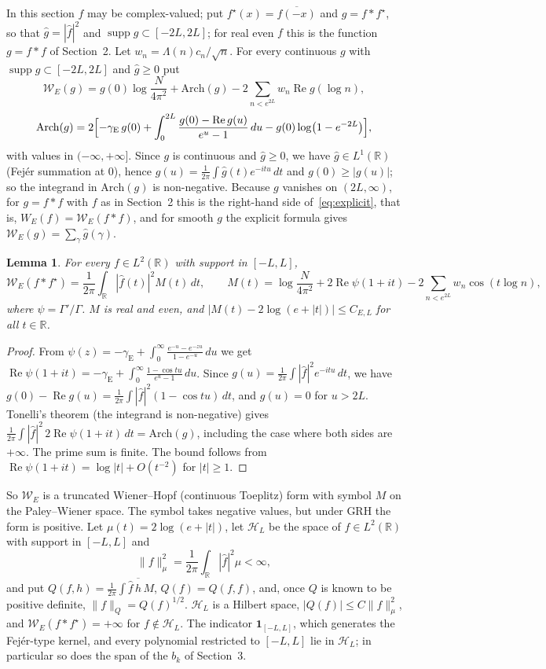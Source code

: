 \documentclass[11pt]{amsart}
\newtheorem{lemma}[theorem]{Lemma}
\theoremstyle{remark}
\theoremstyle{definition}
\newcommand{\R}{\mathbb{R}}
\newcommand{\Hs}{\mathcal{H}_L}
\DeclareMathOperator{\supp}{supp}
\begin{document}
In this section $f$ may be complex-valued; put $f^\star(x)=\overline{f(-x)}$ and $g=f*f^\star$, so that $\hat g=|\hat f|^2$ and $\supp g\subset[-2L,2L]$; for real even $f$ this is the function $g=f*f$ of Section~2. Let $w_n=\Lambda(n)c_n/\sqrt n$. For every continuous $g$ with $\supp g\subset[-2L,2L]$ and $\hat g\ge0$ put
\[
  \mathcal W_E(g)=g(0)\log\frac{N}{4\pi^2}+\mathrm{Arch}(g)-2\sum_{n<e^{2L}}w_n\operatorname{Re}g(\log n),
\]
\[
  \mathrm{Arch}(g)=2\Bigl[-\gamma_{\mathrm E}\,g(0)+\int_0^{2L}\frac{g(0)-\operatorname{Re}g(u)}{e^u-1}\,du-g(0)\log\bigl(1-e^{-2L}\bigr)\Bigr],
\]
with values in $(-\infty,+\infty]$. Since $g$ is continuous and $\hat g\ge0$, we have $\hat g\in L^1(\R)$ (Fej\'er summation at $0$), hence $g(u)=\frac1{2\pi}\int\hat g(t)e^{-itu}\,dt$ and $g(0)\ge|g(u)|$; so the integrand in $\mathrm{Arch}(g)$ is non-negative. Because $g$ vanishes on $(2L,\infty)$, for $g=f*f$ with $f$ as in Section~2 this is the right-hand side of~\eqref{eq:explicit}, that is, $W_E(f)=\mathcal W_E(f*f)$, and for smooth $g$ the explicit formula gives $\mathcal W_E(g)=\sum_\gamma\hat g(\gamma)$.

\begin{lemma}\label{lem:symbol}
For every $f\in L^2(\R)$ with support in $[-L,L]$,
\[
  \mathcal W_E(f*f^\star)=\frac1{2\pi}\int_\R|\hat f(t)|^2M(t)\,dt,\qquad
  M(t)=\log\frac{N}{4\pi^2}+2\operatorname{Re}\psi(1+it)-2\sum_{n<e^{2L}}w_n\cos(t\log n),
\]
where $\psi=\Gamma'/\Gamma$. $M$ is real and even, and $|M(t)-2\log(e+|t|)|\le C_{E,L}$ for all $t\in\R$.
\end{lemma}

\begin{proof}
From $\psi(z)=-\gamma_{\mathrm E}+\int_0^\infty\frac{e^{-u}-e^{-zu}}{1-e^{-u}}\,du$ we get
$\operatorname{Re}\psi(1+it)=-\gamma_{\mathrm E}+\int_0^\infty\frac{1-\cos tu}{e^u-1}\,du$. Since
$g(u)=\frac1{2\pi}\int|\hat f|^2e^{-itu}\,dt$, we have $g(0)-\operatorname{Re}g(u)=\frac1{2\pi}\int|\hat f|^2(1-\cos tu)\,dt$, and
$g(u)=0$ for $u>2L$. Tonelli's theorem (the integrand is non-negative) gives
$\frac1{2\pi}\int|\hat f|^2\,2\operatorname{Re}\psi(1+it)\,dt=\mathrm{Arch}(g)$, including the case where both sides are $+\infty$.
The prime sum is finite. The bound follows from $\operatorname{Re}\psi(1+it)=\log|t|+O(t^{-2})$ for $|t|\ge1$.
\end{proof}

So $\mathcal W_E$ is a truncated Wiener--Hopf (continuous Toeplitz) form with symbol $M$ on the Paley--Wiener space. The symbol takes negative values, but under GRH the form is positive. Let $\mu(t)=2\log(e+|t|)$, let $\Hs$ be the space of $f\in L^2(\R)$ with support in $[-L,L]$ and
\[
  \|f\|_\mu^2=\frac1{2\pi}\int_\R|\hat f|^2\mu<\infty,
\]
and put $Q(f,h)=\frac1{2\pi}\int\hat f\,\overline{\hat h}\,M$, $Q(f)=Q(f,f)$, and, once $Q$ is known to be positive definite, $\|f\|_Q=Q(f)^{1/2}$.
$\Hs$ is a Hilbert space, $|Q(f)|\le C\|f\|_\mu^2$, and $\mathcal W_E(f*f^\star)=+\infty$ for $f\notin\Hs$. The indicator $\mathbf 1_{[-L,L]}$, which generates the Fej\'er-type kernel, and every polynomial restricted to $[-L,L]$ lie in $\Hs$; in particular so does the span of the $b_k$ of Section~3.
\end{document}
